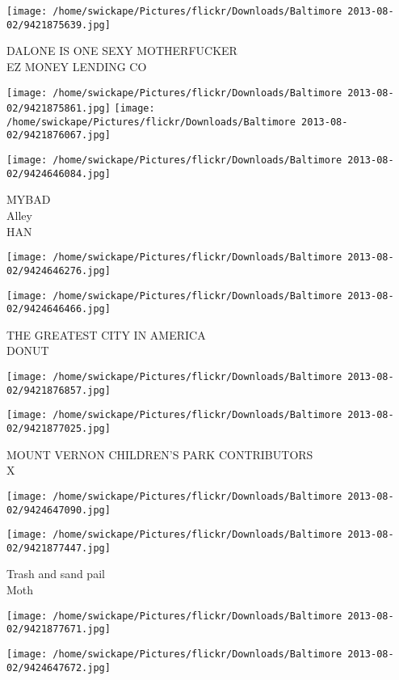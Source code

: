 \documentclass[10pt,letterpaper]{article}
\begin{document}
\vspace{0.25in}
\texttt{[image: /home/swickape/Pictures/flickr/Downloads/Baltimore 2013-08-02/9421875639.jpg]}

DALONE IS ONE SEXY MOTHERFUCKER\\
EZ MONEY LENDING CO
\pagebreak

\texttt{[image: /home/swickape/Pictures/flickr/Downloads/Baltimore 2013-08-02/9421875861.jpg]}
\texttt{[image: /home/swickape/Pictures/flickr/Downloads/Baltimore 2013-08-02/9421876067.jpg]}

\texttt{[image: /home/swickape/Pictures/flickr/Downloads/Baltimore 2013-08-02/9424646084.jpg]}

MYBAD\\
Alley\\
HAN
\pagebreak

\texttt{[image: /home/swickape/Pictures/flickr/Downloads/Baltimore 2013-08-02/9424646276.jpg]}

\vspace{0.25in}
\texttt{[image: /home/swickape/Pictures/flickr/Downloads/Baltimore 2013-08-02/9424646466.jpg]}

THE GREATEST CITY IN AMERICA\\
DONUT
\pagebreak

\texttt{[image: /home/swickape/Pictures/flickr/Downloads/Baltimore 2013-08-02/9421876857.jpg]}

\vspace{0.25in}
\texttt{[image: /home/swickape/Pictures/flickr/Downloads/Baltimore 2013-08-02/9421877025.jpg]}

MOUNT VERNON CHILDREN'S PARK CONTRIBUTORS\\
X
\pagebreak

\texttt{[image: /home/swickape/Pictures/flickr/Downloads/Baltimore 2013-08-02/9424647090.jpg]}

\vspace{0.25in}
\texttt{[image: /home/swickape/Pictures/flickr/Downloads/Baltimore 2013-08-02/9421877447.jpg]}

Trash and sand pail\\
Moth
\pagebreak

\texttt{[image: /home/swickape/Pictures/flickr/Downloads/Baltimore 2013-08-02/9421877671.jpg]}

\vspace{0.25in}
\texttt{[image: /home/swickape/Pictures/flickr/Downloads/Baltimore 2013-08-02/9424647672.jpg]}
\end{document}
